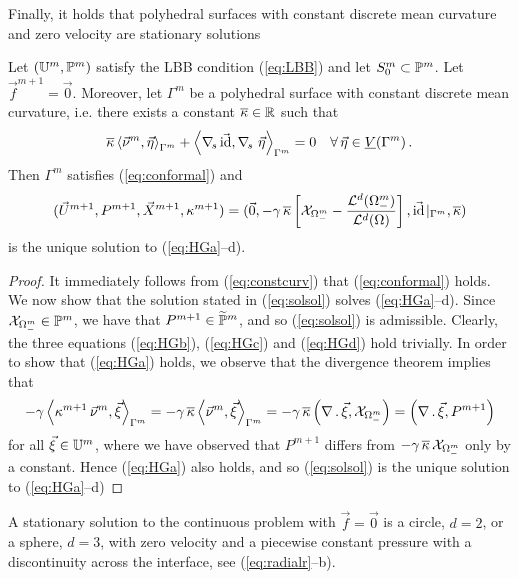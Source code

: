Finally, it holds that polyhedral surfaces with constant discrete mean
curvature and zero velocity are stationary solutions
\begin{theorem} \label{thm:stat2}
Let $(\mathbb{U}^m,\mathbb{P}^m)$ satisfy the LBB condition (\ref{eq:LBB}) and let
$S^m_0 \subset \mathbb{P}^m$. Let $\vec f^{m+1} = \vec 0$. Moreover, let
$\Gamma^m$ be a polyhedral surface with constant discrete mean curvature,
i.e. there exists a constant $\overline{\kappa}\in{\mathbb R}$ such that
\begin{equation}\label{eq:constcurv}
\overline{\kappa} \left\langle\vec\nu^m,\vec\eta\right\rangle_{\Gamma^m}
+ \left\langle \nabs\, \vec\id,\nabs\ \vec\eta\right\rangle_{\Gamma^m}=0\quad
\forall \,\vec\eta\in\Vh\,.
\end{equation}
Then $\Gamma^m$ satisfies (\ref{eq:conformal}) and
\begin{equation} \label{eq:solsol}
(\vec U^{m+1}, P^{m+1}, \vec X^{m+1}, \kappa^{m+1}) =
(\vec 0, -\gamma\,\overline\kappa\left[
\mathrm{\mathcal{X}}_{\Omega_-^m} - \frac{\mathcal{L}^d(\Omega_-^m)}{\mathcal{L}^d(\Omega)}
\right], \vec{\rm id}\!\mid_{\Gamma^m}, \overline{\kappa})
\end{equation}
is the unique solution to (\ref{eq:HGa}--d).
\end{theorem}
\begin{proof}
It immediately follows from (\ref{eq:constcurv}) that (\ref{eq:conformal})
holds. We now show that the solution stated in (\ref{eq:solsol}) solves
(\ref{eq:HGa}--d). Since $\mathrm{\mathcal{X}}_{\Omega_-^m} \in \mathbb{P}^m$, we have
that $P^{m+1} \in \widetilde{\mathbb{P}}^m$, and so (\ref{eq:solsol}) is admissible.
Clearly, the three equations (\ref{eq:HGb}), (\ref{eq:HGc}) and (\ref{eq:HGd})
hold trivially. In order to show that (\ref{eq:HGa}) holds, we observe that the
divergence theorem implies that
\begin{equation*}
- \gamma \left\langle \kappa^{m+1}\,\vec\nu^m, \vec\xi
\right\rangle_{\Gamma^m}
= - \gamma\,\overline\kappa \left\langle \vec\nu^m, \vec\xi
\right\rangle_{\Gamma^m}
= - \gamma\,\overline\kappa \left(\nabla\,.\,\vec\xi,
\mathrm{\mathcal{X}}_{\Omega_-^m}\right)
= \left(\nabla\,.\,\vec\xi, P^{m+1} \right)
\end{equation*}
for all $\vec\xi \in \mathbb{U}^m$, where we have observed that $P^{m+1}$ differs
from $- \gamma\,\overline\kappa\,\mathrm{\mathcal{X}}_{\Omega_-^m}$ only by a constant.
Hence (\ref{eq:HGa}) also holds, and so (\ref{eq:solsol}) is the unique
solution to (\ref{eq:HGa}--d)
\end{proof}

A stationary solution to the continuous problem with $\vec f = \vec 0$ is a
circle, $d=2$, or a sphere, $d=3$, with zero velocity and a piecewise constant
pressure with a discontinuity across the interface, see (\ref{eq:radialr}--b).

